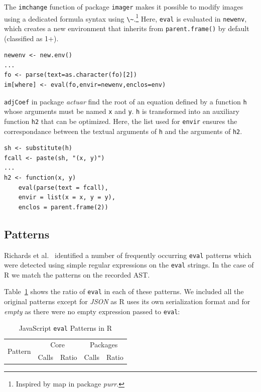\documentclass[USenglish,cleveref, autoref, thm-restate]{lipics-v2019}
\newcommand{\eval}{\texttt{eval}\xspace}
\renewcommand{\c}[1]{\lstinline{#1}\xspace}
\begin{document}
The \c{imchange} function of package \c{imager} makes it possible to modify
images using a dedicated formula syntax using \c{\~}.\footnote{Inspired by
 {map} in package \emph{purr}.}  Here, \eval is evaluated in \c{newenv},
which creates a new environment that inherits from \c{parent.frame()} by
default (classified as 1+).


\begin{lstlisting}
newenv <- new.env()
...
fo <- parse(text=as.character(fo)[2])
im[where] <- eval(fo,envir=newenv,enclos=env)
\end{lstlisting}

\c{adjCoef} in package \emph{actuar} find the root of an equation defined by
a function \c{h} whose arguments must be named \c{x} and \c{y}.  \c{h} is
transformed into an auxiliary function \c{h2} that can be optimized. Here,
the list used for \c{envir} ensures the correspondance between the textual
arguments of \c{h} and the arguments of \c{h2}.


\begin{lstlisting}
sh <- substitute(h)
fcall <- paste(sh, "(x, y)")
...
h2 <- function(x, y)
    eval(parse(text = fcall),
    envir = list(x = x, y = y),
    enclos = parent.frame(2))
\end{lstlisting}

\subsection{Patterns}

Richards et al.~\cite{ecoop11} identified a number of frequently occurring \eval
patterns which were detected using simple regular expressions on the \eval
strings. In the case of R we match the patterns on the recorded AST.

Table~\ref{table:js-pattens-in-r} shows the ratio of \eval in each of these
patterns. We included all the original patterns except for \emph{JSON} as R uses
its own serialization format and for \emph{empty} as there were no empty expression
passed to \eval:

\begin{table}[ht]%
  \centering
\begin{tabular}{r|r|r|r|r}\hline
\multirow{2}{*}{Pattern} & \multicolumn{2}{c|}{Core} & \multicolumn{2}{c}{Packages} \\
                         & Calls & Ratio            & Calls & Ratio \\\hline

\end{tabular}
\caption{JavaScript \eval Patterns in R}
\label{table:js-pattens-in-r}
\end{table}
\end{document}
